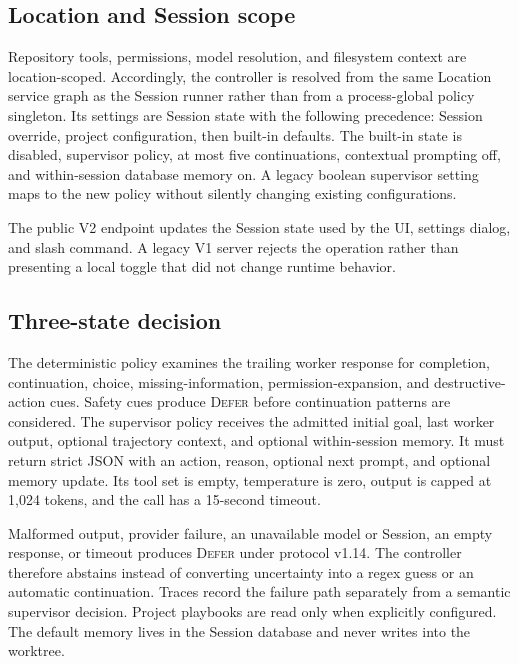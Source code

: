 \documentclass[sigconf,nonacm]{acmart}
\newcommand{\deferaction}{\textsc{Defer}}
\begin{document}
\subsection{Location and Session scope}

Repository tools, permissions, model resolution, and filesystem context are location-scoped. Accordingly, the controller is resolved from the same Location service graph as the Session runner rather than from a process-global policy singleton. Its settings are Session state with the following precedence: Session override, project configuration, then built-in defaults. The built-in state is disabled, supervisor policy, at most five continuations, contextual prompting off, and within-session database memory on. A legacy boolean supervisor setting maps to the new policy without silently changing existing configurations.

The public V2 endpoint updates the Session state used by the UI, settings dialog, and slash command. A legacy V1 server rejects the operation rather than presenting a local toggle that did not change runtime behavior.

\subsection{Three-state decision}

The deterministic policy examines the trailing worker response for completion, continuation, choice, missing-information, permission-expansion, and destructive-action cues. Safety cues produce \deferaction{} before continuation patterns are considered. The supervisor policy receives the admitted initial goal, last worker output, optional trajectory context, and optional within-session memory. It must return strict JSON with an action, reason, optional next prompt, and optional memory update. Its tool set is empty, temperature is zero, output is capped at 1,024 tokens, and the call has a 15-second timeout.

Malformed output, provider failure, an unavailable model or Session, an empty response, or timeout produces \deferaction{} under protocol v1.14. The controller therefore abstains instead of converting uncertainty into a regex guess or an automatic continuation. Traces record the failure path separately from a semantic supervisor decision. Project playbooks are read only when explicitly configured. The default memory lives in the Session database and never writes  into the worktree.
\end{document}
